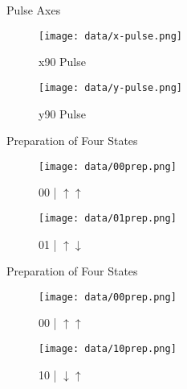 \documentclass{beamer}
\begin{document}
\begin{frame}{Pulse Axes}
	\begin{figure}
	\begin{minipage}[c]{.2\textwidth}
		\caption*{x90 Pulse}
	\end{minipage}%
	\begin{minipage}[c]{.8\textwidth}
		\texttt{[image: data/x-pulse.png]}
	\end{minipage}
	\end{figure}
	\begin{figure}
	\begin{minipage}[c]{.2\textwidth}
		\caption*{y90 Pulse}
	\end{minipage}%
	\begin{minipage}[c]{.8\textwidth}
		\texttt{[image: data/y-pulse.png]}
	\end{minipage}
	\end{figure}
\end{frame}

\begin{frame}{Preparation of Four States}
	\begin{figure}
	\begin{minipage}[c]{.2\textwidth}
		\caption*{00 | $\uparrow \uparrow$}
	\end{minipage}%
	\begin{minipage}[c]{.8\textwidth}
		\texttt{[image: data/00prep.png]}
	\end{minipage}
	\end{figure}
	\begin{figure}
	\begin{minipage}[c]{.2\textwidth}
		\caption*{01 | $\uparrow \downarrow$}
	\end{minipage}%
	\begin{minipage}[c]{.8\textwidth}
		\texttt{[image: data/01prep.png]}
	\end{minipage}
	\end{figure}
\end{frame}

\begin{frame}{Preparation of Four States}
	\begin{figure}
	\begin{minipage}[c]{.2\textwidth}
		\caption*{00 | $\uparrow \uparrow$}
	\end{minipage}%
	\begin{minipage}[c]{.8\textwidth}
		\texttt{[image: data/00prep.png]}
	\end{minipage}
	\end{figure}
	\begin{figure}
	\begin{minipage}[c]{.2\textwidth}
		\caption*{10 | $\downarrow \uparrow$}
	\end{minipage}%
	\begin{minipage}[c]{.8\textwidth}
		\texttt{[image: data/10prep.png]}
	\end{minipage}
	\end{figure}
\end{frame}
\end{document}
